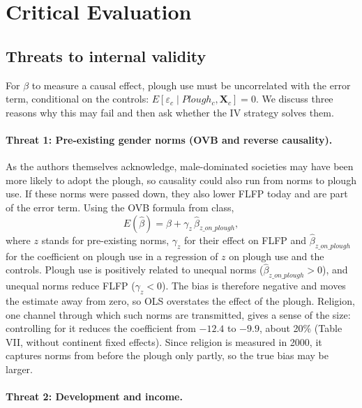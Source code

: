 \documentclass[12pt,a4paper]{article}
\begin{document}
\section{Critical Evaluation}
\subsection{Threats to internal validity}

For $\beta$ to measure a causal effect, plough use must be uncorrelated with the error term, conditional on the controls: $E[\varepsilon_c \mid Plough_c, \mathbf{X}_c] = 0$. We discuss three reasons why this may fail and then ask whether the IV strategy solves them.

\paragraph{Threat 1: Pre-existing gender norms (OVB and reverse causality).}

As the authors themselves acknowledge, male-dominated societies may have been more likely to adopt the plough, so causality could also run from norms to plough use. If these norms were passed down, they also lower FLFP today and are part of the error term. Using the OVB formula from class,
\[
E(\hat\beta) = \beta + \gamma_z \, \hat\beta_{z\_on\_plough} ,
\]
where $z$ stands for pre-existing norms, $\gamma_z$ for their effect on FLFP and $\hat\beta_{z\_on\_plough}$ for the coefficient on plough use in a regression of $z$ on plough use and the controls. Plough use is positively related to unequal norms ($\hat\beta_{z\_on\_plough} > 0$), and unequal norms reduce FLFP ($\gamma_z < 0$). The bias is therefore negative and moves the estimate away from zero, so OLS overstates the effect of the plough. Religion, one channel through which such norms are transmitted, gives a sense of the size: controlling for it reduces the coefficient from $-12.4$ to $-9.9$, about 20\% (Table VII, without continent fixed effects). Since religion is measured in 2000, it captures norms from before the plough only partly, so the true bias may be larger.

\paragraph{Threat 2: Development and income.}
\end{document}
